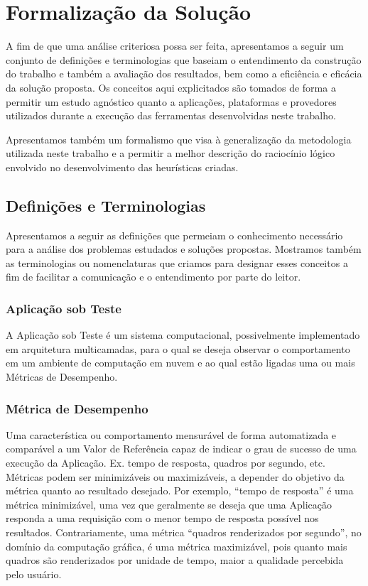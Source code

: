 \chapter[Formalização da Solução]{Formalização da Solução}
A fim de que uma análise criteriosa possa ser feita, apresentamos a seguir um 
conjunto de definições e terminologias que baseiam o entendimento da 
construção do trabalho e também a avaliação dos resultados, bem como a eficiência 
e eficácia da solução proposta. Os conceitos aqui explicitados são tomados de 
forma a permitir um estudo agnóstico quanto a aplicações, plataformas e provedores
utilizados durante a execução das ferramentas desenvolvidas neste trabalho.

Apresentamos também um formalismo que visa à generalização da metodologia 
utilizada neste trabalho e a permitir a melhor descrição do raciocínio lógico 
envolvido no desenvolvimento das heurísticas criadas.

\section{Definições e Terminologias}
Apresentamos a seguir as definições que permeiam o conhecimento necessário para 
a análise dos problemas estudados e soluções propostas. Mostramos também as 
terminologias ou nomenclaturas que criamos para designar esses conceitos a fim 
de facilitar a comunicação e o entendimento por parte do leitor.

\subsection{Aplicação sob Teste}
A Aplicação sob Teste é um sistema computacional, possivelmente implementado em 
arquitetura multicamadas, para o qual se deseja observar o comportamento em um 
ambiente de computação em nuvem e ao qual estão ligadas uma ou mais Métricas de 
Desempenho.

\subsection{Métrica de Desempenho}
Uma característica ou comportamento mensurável de forma automatizada e 
comparável a um Valor de Referência capaz de indicar o grau de sucesso de uma 
execução da Aplicação. Ex. tempo de resposta, quadros por segundo, etc. Métricas 
podem ser minimizáveis ou maximizáveis, a depender do objetivo da métrica quanto 
ao resultado desejado. Por exemplo, “tempo de resposta” é uma métrica 
minimizável, uma vez que geralmente se deseja que uma Aplicação responda a uma 
requisição com o menor tempo de resposta possível nos resultados. Contrariamente, 
uma métrica “quadros renderizados por segundo”, no domínio da computação gráfica, 
é uma métrica maximizável, pois quanto mais quadros são renderizados por unidade 
de tempo, maior a qualidade percebida pelo usuário.

